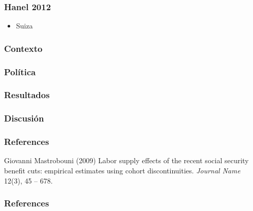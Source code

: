 \documentclass{beamer}
\begin{document}
\frame
{
  \frametitle{Hanel 2012}
  \begin{itemize}
  \item Suiza
  \end{itemize}
}

\frame
{
  \frametitle{Contexto}
}

\frame
{
  \frametitle{Política}
}
\frame
{
  \frametitle{Resultados}
}
\frame
{
  \frametitle{Discusión}
}
              
\begin{frame}
\frametitle{References}
\footnotesize{
\begin{thebibliography}{99} %
 Giovanni Mastrobouni (2009)
\newblock Labor supply effects of the recent social security benefit cuts: empirical estimates using cohort discontinuities.
\newblock \emph{Journal Name} 12(3), 45 -- 678.
\end{thebibliography}
}
\end{frame}

\begin{frame}[t, allowframebreaks]
\frametitle{References}


\end{frame}
\end{document}
